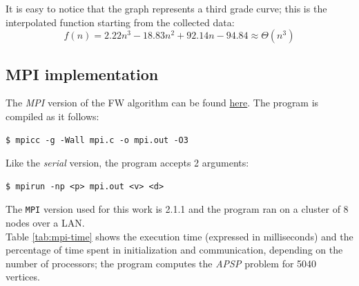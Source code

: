 It is easy to notice that the graph represents a 
third grade curve; this is the interpolated function starting from the collected data:
\[f(n) = 2.22n^3 - 18.83n^2 + 92.14n -94.84 \approx \Theta(n^3) \]



\subsection{MPI implementation}

The \emph{MPI} version of the FW algorithm can be found \href{https://github.com/firaja/Parallel-FloydWarshall/blob/master/mpi.c}{here}. 
The program is compiled as it follows:

\begin{lstlisting}[basicstyle=\footnotesize\ttfamily]
$ mpicc -g -Wall mpi.c -o mpi.out -O3
\end{lstlisting}
Like the \emph{serial} version, the program accepts 2 arguments:
\begin{lstlisting}[basicstyle=\footnotesize\ttfamily]
$ mpirun -np <p> mpi.out <v> <d>
\end{lstlisting}
The \texttt{MPI} version used for this work is 2.1.1 and the program ran on a cluster of 8 nodes over a LAN. \\
Table \ref*{tab:mpi-time} shows the execution time (expressed in milliseconds) and the percentage of time spent in initialization and communication, depending on the number of processors; 
the program computes the \emph{APSP} problem for 5040 vertices.

